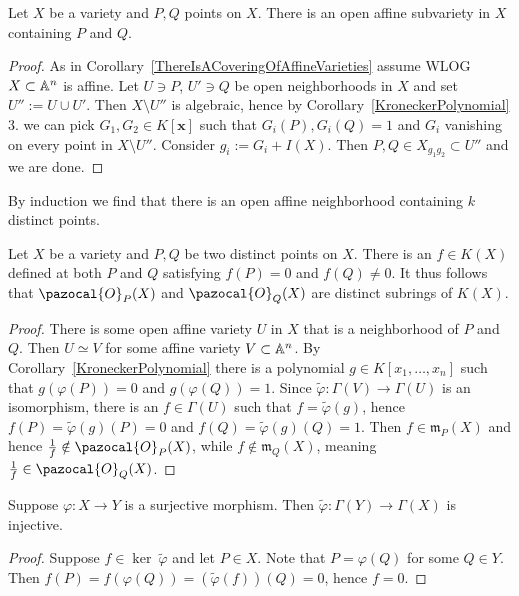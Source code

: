     \begin{lemma}
        Let $X$ be a variety and $P,Q$ points on $X$. There is an open affine subvariety in $X$ containing $P$ and $Q$.
    \end{lemma}
    \begin{proof}
        As in Corollary~\ref{ThereIsACoveringOfAffineVarieties} assume WLOG $X\subset\mathbb{A}^n$ is affine. Let $U\ni P$, $U'\ni Q$ be open neighborhoods in $X$ and set $U'':= U\cup U'$. Then $X\setminus U''$ is algebraic, hence by Corollary~\ref{KroneckerPolynomial} 3. we can pick $G_1,G_2\in K[\mathbf{x}]$ such that $G_i(P),G_i(Q)= 1$ and $G_i$ vanishing on every point in $X\setminus U''$. Consider $g_i := G_i + I(X)$. Then $P,Q\in X_{g_1g_2} \subset U''$ and we are done.   
    \end{proof}
    \begin{remark}
        By induction we find that there is an open affine neighborhood containing $k$ distinct points. 
    \end{remark}
    \begin{lemma}\label{WeCanConstructRationalFunctionVanishingAtOnePointAndNotAnoter}
        Let $X$ be a variety and $P,Q$ be two distinct points on $X$. There is an $f\in K(X)$ defined at both $P$ and $Q$ satisfying $f(P)=0$ and $f(Q)\neq 0$. It thus follows that $\pazocal{O}_P(X)$ and $\pazocal{O}_Q(X)$ are distinct subrings of $K(X)$.
    \end{lemma}
    \begin{proof}
        There is some open affine variety $U$ in $X$ that is a neighborhood of $P$ and $Q$. Then $U\simeq V$ for some affine variety $V\subset \mathbb{A}^n$. By Corollary~\ref{KroneckerPolynomial} there is a polynomial $g\in K[x_1,\dots,x_n]$ such that $g(\varphi(P))=0$ and $g(\varphi(Q))=1$. Since $\widetilde{\varphi}: \Gamma(V)\rightarrow \Gamma(U)$ is an isomorphism, there is an $f\in \Gamma(U)$ such that $f=\widetilde{\varphi}(g)$, hence $f(P)=\widetilde{\varphi}(g)(P)=0$ and $f(Q)=\widetilde{\varphi}(g)(Q)=1$. Then $f\in \mathfrak{m}_P(X)$ and hence $\frac{1}{f}\notin \pazocal{O}_P(X)$, while $f\notin \mathfrak{m}_Q(X)$, meaning $\frac{1}{f}\in \pazocal{O}_Q(X)$. 
    \end{proof}
    \begin{lemma}
        Suppose $\varphi: X\rightarrow Y$ is a surjective morphism. Then $\widetilde{\varphi}: \Gamma(Y)\rightarrow \Gamma(X)$ is injective. 
    \end{lemma}
    \begin{proof}
        Suppose $f\in \ker\ \widetilde{\varphi}$ and let $P\in X$. Note that $P=\varphi(Q)$ for some $Q\in Y$. Then $f(P)=f(\varphi(Q))=(\widetilde{\varphi}(f))(Q)=0$, hence $f=0$.
    \end{proof}
